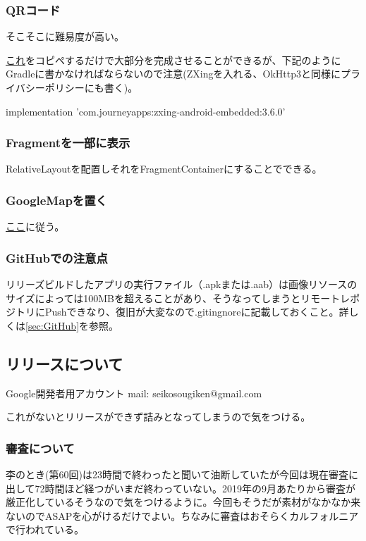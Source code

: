 \documentclass[dvipdfmx,jb5]{jarticle}
\newcommand{\link}[2]{\href{#2}{#1}}
\begin{document}
 \subsubsection{QRコード}
 そこそこに難易度が高い。\par
 \link{これ}{https://github.com/SeikoStudentCouncil/SeikoFestaAndroidApp62nd/blob/master/app/src/main/java/jp/ac/seiko/itec/seikofestaapp62nd/fragments/treasurehunt/QRCodeFragment.kt}をコピペするだけで大部分を完成させることができるが、下記のようにGradleに書かなければならないので注意(ZXingを入れる、OkHttp3と同様にプライバシーポリシーにも書く)。\par
 implementation 'com.journeyapps:zxing-android-embedded:3.6.0'
 \subsubsection{Fragmentを一部に表示}
 RelativeLayoutを配置しそれをFragmentContainerにすることでできる。
 \subsubsection{GoogleMapを置く}
 \link{ここ}{https://developers.google.com/maps/documentation/android-sdk/start?hl=ja}に従う。
 \subsubsection{GitHubでの注意点}
 リリーズビルドしたアプリの実行ファイル（.apkまたは.aab）は画像リソースのサイズによっては100MBを超えることがあり、そうなってしまうとリモートレポジトリにPushできなり、復旧が大変なので.gitingnoreに記載しておくこと。詳しくは\ref{sec:GitHub}を参照。
\subsection{リリースについて}
\begin{itembox}[l]{Google開発者用アカウント}
\color{red}
mail: seikosougiken@gmail.com\\
\end{itembox}
これがないとリリースができず詰みとなってしまうので気をつける。
\subsubsection{審査について}
李のとき(第60回)は23時間で終わったと聞いて油断していたが今回は現在審査に出して72時間ほど経つがいまだ終わっていない。2019年の9月あたりから審査が厳正化しているそうなので気をつけるように。今回もそうだが素材がなかなか来ないのでASAPを心がけるだけでよい。ちなみに審査はおそらくカルフォルニアで行われている。
\end{document}
